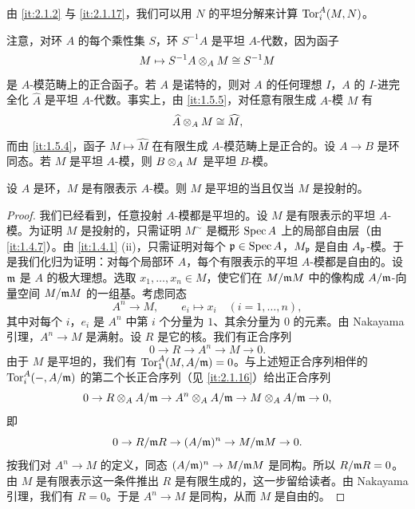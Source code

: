 由 \ref{it:2.1.2} 与 \ref{it:2.1.17}，我们可以用 $N$ 的平坦分解来计算 $\operatorname{Tor}_i^A(M,N)$。

注意，对环 $A$ 的每个乘性集 $S$，环 $S^{-1}A$ 是平坦 $A$-代数，因为函子
\[
M\mapsto S^{-1}A\otimes_A M\cong S^{-1}M
\]
是 $A$-模范畴上的正合函子。若 $A$ 是诺特的，则对 $A$ 的任何理想 $I$，$A$ 的 $I$-进完全化 $\widehat A$ 是平坦 $A$-代数。事实上，由 \ref{it:1.5.5}，对任意有限生成 $A$-模 $M$ 有
\[
\widehat A\otimes_A M\cong\widehat M,
\]
而由 \ref{it:1.5.4}，函子 $M\mapsto\widehat M$ 在有限生成 $A$-模范畴上是正合的。设 $A\to B$ 是环同态。若 $M$ 是平坦 $A$-模，则 $B\otimes_A M$ 是平坦 $B$-模。

\begin{proposition}\label{it:2.1.18}
设 $A$ 是环，$M$ 是有限表示 $A$-模。则 $M$ 是平坦的当且仅当 $M$ 是投射的。
\end{proposition}
\begin{proof}
我们已经看到，任意投射 $A$-模都是平坦的。设 $M$ 是有限表示的平坦 $A$-模。为证明 $M$ 是投射的，只需证明 $M^\sim$ 是概形 $\operatorname{Spec} A$ 上的局部自由层（由 \ref{it:1.4.7}）。由 \ref{it:1.4.1} (ii)，只需证明对每个 $\mathfrak{p}\in\operatorname{Spec} A$，$M_{\mathfrak{p}}$ 是自由 $A_{\mathfrak{p}}$-模。于是我们化归为证明：对每个局部环 $A$，每个有限表示的平坦 $A$-模都是自由的。设 $\mathfrak{m}$ 是 $A$ 的极大理想。选取 $x_1,\dots,x_n\in M$，使它们在 $M/\mathfrak{m} M$ 中的像构成 $A/\mathfrak{m}$-向量空间 $M/\mathfrak{m} M$ 的一组基。考虑同态
\[
A^n\to M,\qquad e_i\mapsto x_i\quad(i=1,\dots,n),
\]
其中对每个 $i$，$e_i$ 是 $A^n$ 中第 $i$ 个分量为 $1$、其余分量为 $0$ 的元素。由 Nakayama 引理，$A^n\to M$ 是满射。设 $R$ 是它的核。我们有正合序列
\[
0\to R\to A^n\to M\to 0.
\]
由于 $M$ 是平坦的，我们有 $\operatorname{Tor}_1^A(M,A/\mathfrak{m})=0$。与上述短正合序列相伴的 $\operatorname{Tor}_i^A(-,A/\mathfrak{m})$ 的第二个长正合序列（见 \ref{it:2.1.16}）给出正合序列
\[
0\to R\otimes_A A/\mathfrak{m}\to A^n\otimes_A A/\mathfrak{m}\to M\otimes_A A/\mathfrak{m}\to 0,
\]
即
\[
0\to R/\mathfrak{m} R\to(A/\mathfrak{m})^n\to M/\mathfrak{m} M\to 0.
\]
按我们对 $A^n\to M$ 的定义，同态 $(A/\mathfrak{m})^n\to M/\mathfrak{m} M$ 是同构。所以 $R/\mathfrak{m} R=0$。由 $M$ 是有限表示这一条件推出 $R$ 是有限生成的，这一步留给读者。由 Nakayama 引理，我们有 $R=0$。于是 $A^n\to M$ 是同构，从而 $M$ 是自由的。
\end{proof}

